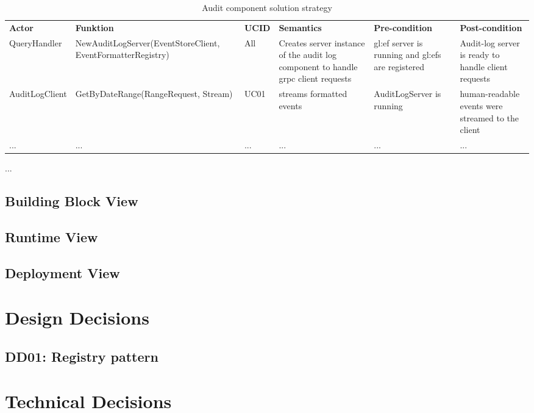 \begin{table}[H]
  \footnotesize
  \begin{center}
    \caption{Audit component solution strategy}
    \label{tab:acss}
    \def\arraystretch{1.5}
    \begin{tabularx}{\linewidth}{|l X l X X X |}
      \hline
      \rowcolor{gray!20}
      \textbf{Actor} & \textbf{Funktion} & \textbf{UCID} & \textbf{Semantics} & \textbf{Pre-condition} & \textbf{Post-condition}\\
      QueryHandler & New\-Audit\-Log\-Server\-(Event\-Store\-Client, Event\-Formatter\-Registry) & All & Creates server instance of the audit log component to handle grpc client requests & \gls{gl:ef} server is running and \glspl{gl:ef} are registered & Audit-log server is ready to handle client requests  \\
      AuditLogClient & Get\-By\-Date\-Range(Range\-Request, Stream) & UC01 & streams formatted events & Audit\-Log\-Server is running & human-readable events were streamed to the client  \\
      ... & ... & ... & ... & ... & ...  \\
      \hline
    \end{tabularx}
  \end{center}
\end{table}
...



\subsection{Building Block View}

% 
% 


\subsection{Runtime View}

\subsection{Deployment View}


\section{Design Decisions}

\subsection{DD01: Registry pattern}


\section{Technical Decisions}

